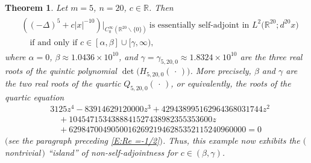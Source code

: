 \documentclass[reqno,11pt,centertags]{amsart}
\newcommand{\bbR}{{\mathbb{R}}}
\newcommand{\<}{\langle}
\renewcommand{\>}{\rangle}
\newcommand{\no}{\nonumber}
\newcommand{\lb}{\label}
\numberwithin{equation}{section}
\newtheorem{theorem}{Theorem}[section]
\theoremstyle{definition}
\begin{document}
 \begin{theorem} \lb{t4.4}
Let  $m=5$, $n=20$, $c \in \bbR$. Then 
\begin{align}
\begin{split} 
& \left((-\Delta)^5 +c|x|^{-10}\right)\big|_{C_0^{\infty}(\bbR^{20} \backslash \{0\})}\ \mbox{is essentially self-adjoint  in $L^2\big(\bbR^{20}; d^{20}x\big)$}    \\ 
& \quad \text{if and only if $c \in [\alpha,\beta] \cup [\gamma,\infty)$}, 
\end{split} 
\end{align}
where $\alpha = 0$, $\beta \approx 1.0436 \times 10^{10}$, and $\gamma = \gamma_{5,20,0} \approx 1.8324 \times 10^{10}$ are the three real roots of the quintic polynomial $\det\big(H_{5,20,0}(\,\cdot\,)\big)$. More precisely, $\beta$ and $\gamma$ are the two real roots of the quartic $Q_{5,20,0}(\,\cdot\,)$, or equivalently, the roots of the quartic equation
\begin{align}
&3125 z^4-83914629120000 z^3+429438995162964368031744 z^2    \no \\
&\quad +1045471534388841527438982355353600 z       \lb{4.26} \\  
&\quad +629847004905001626921946285352115240960000 =0    \no 
\end{align}
$($see the paragraph preceding \eqref{E:Re =-1/2}$)$. 
Thus, this example now exhibits the $($nontrivial\,$)$ ``island'' of non-self-adjointness for $c \in (\beta,\gamma)$.
\end{theorem}
\end{document}
